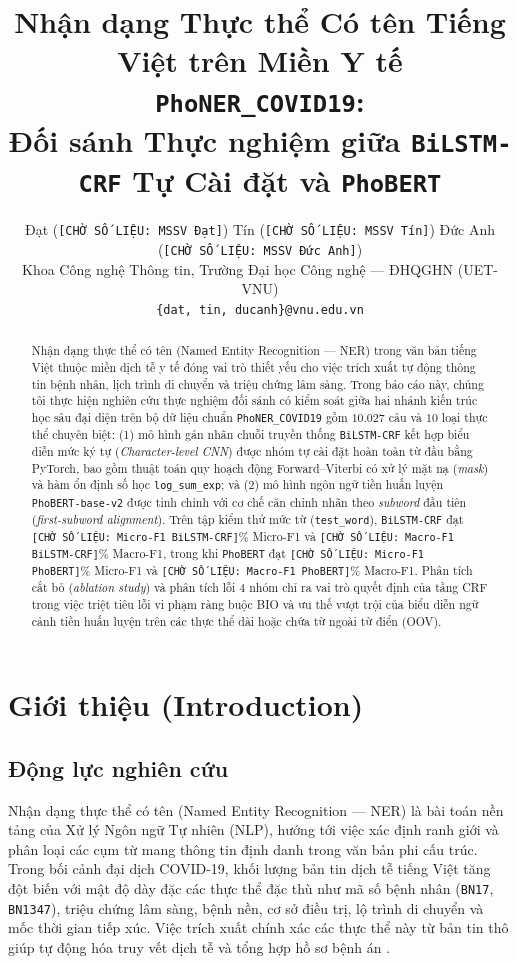 \documentclass[11pt,a4paper,twocolumn]{article}
\title{Nhận dạng Thực thể Có tên Tiếng Việt trên Miền Y tế \texttt{PhoNER\_COVID19}:\\
Đối sánh Thực nghiệm giữa \texttt{BiLSTM-CRF} Tự Cài đặt và \texttt{PhoBERT}}
\author{
  Đạt (\texttt{[CHỜ SỐ LIỆU: MSSV Đạt]}) \quad
  Tín (\texttt{[CHỜ SỐ LIỆU: MSSV Tín]}) \quad
  Đức Anh (\texttt{[CHỜ SỐ LIỆU: MSSV Đức Anh]}) \\
  Khoa Công nghệ Thông tin, Trường Đại học Công nghệ — ĐHQGHN (UET-VNU) \\
  \texttt{\{dat, tin, ducanh\}@vnu.edu.vn}
}
\date{}
\begin{document}
\maketitle

\begin{abstract}
Nhận dạng thực thể có tên (Named Entity Recognition — NER) trong văn bản tiếng Việt thuộc miền dịch tễ y tế đóng vai trò thiết yếu cho việc trích xuất tự động thông tin bệnh nhân, lịch trình di chuyển và triệu chứng lâm sàng. Trong báo cáo này, chúng tôi thực hiện nghiên cứu thực nghiệm đối sánh có kiểm soát giữa hai nhánh kiến trúc học sâu đại diện trên bộ dữ liệu chuẩn \texttt{PhoNER\_COVID19} \citep{truong-etal-2021-covid} gồm $10.027$ câu và $10$ loại thực thể chuyên biệt: (1) mô hình gán nhãn chuỗi truyền thống \texttt{BiLSTM-CRF} kết hợp biểu diễn mức ký tự (\textit{Character-level CNN}) được nhóm tự cài đặt hoàn toàn từ đầu bằng PyTorch, bao gồm thuật toán quy hoạch động Forward--Viterbi có xử lý mặt nạ (\textit{mask}) và hàm ổn định số học \texttt{log\_sum\_exp}; và (2) mô hình ngôn ngữ tiền huấn luyện \texttt{PhoBERT-base-v2} \citep{nguyen-nguyen-2020-phobert} được tinh chỉnh với cơ chế căn chỉnh nhãn theo \textit{subword} đầu tiên (\textit{first-subword alignment}). Trên tập kiểm thử mức từ (\texttt{test\_word}), \texttt{BiLSTM-CRF} đạt \texttt{[CHỜ SỐ LIỆU: Micro-F1 BiLSTM-CRF]}\% Micro-F1 và \texttt{[CHỜ SỐ LIỆU: Macro-F1 BiLSTM-CRF]}\% Macro-F1, trong khi \texttt{PhoBERT} đạt \texttt{[CHỜ SỐ LIỆU: Micro-F1 PhoBERT]}\% Micro-F1 và \texttt{[CHỜ SỐ LIỆU: Macro-F1 PhoBERT]}\% Macro-F1. Phân tích cắt bỏ (\textit{ablation study}) và phân tích lỗi $4$ nhóm chỉ ra vai trò quyết định của tầng CRF trong việc triệt tiêu lỗi vi phạm ràng buộc BIO và ưu thế vượt trội của biểu diễn ngữ cảnh tiền huấn luyện trên các thực thể dài hoặc chứa từ ngoài từ điển (OOV).
\end{abstract}

\section{Giới thiệu (Introduction)}
\label{sec:intro}

\subsection{Động lực nghiên cứu}
Nhận dạng thực thể có tên (Named Entity Recognition — NER) là bài toán nền tảng của Xử lý Ngôn ngữ Tự nhiên (NLP), hướng tới việc xác định ranh giới và phân loại các cụm từ mang thông tin định danh trong văn bản phi cấu trúc. Trong bối cảnh đại dịch COVID-19, khối lượng bản tin dịch tễ tiếng Việt tăng đột biến với mật độ dày đặc các thực thể đặc thù như mã số bệnh nhân (\texttt{BN17}, \texttt{BN1347}), triệu chứng lâm sàng, bệnh nền, cơ sở điều trị, lộ trình di chuyển và mốc thời gian tiếp xúc. Việc trích xuất chính xác các thực thể này từ bản tin thô giúp tự động hóa truy vết dịch tễ và tổng hợp hồ sơ bệnh án \citep{truong-etal-2021-covid}.
\end{document}
